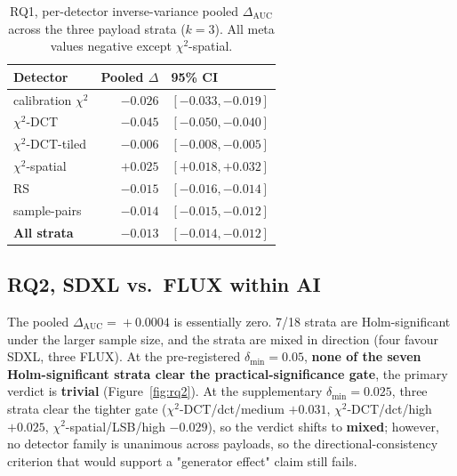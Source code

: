 \documentclass[10pt,twocolumn,a4paper]{article}
\begin{document}
\begin{table}[t]
\centering\small
\caption{RQ1, per-detector inverse-variance pooled $\Delta_\text{AUC}$ across the three payload strata ($k\!=\!3$). All meta values negative except $\chi^2$-spatial.}
\label{tab:rq1meta}
\setlength{\tabcolsep}{5pt}\renewcommand{\arraystretch}{1.1}
\begin{tabular}{@{}l r l@{}}
\toprule
\textbf{Detector} & \textbf{Pooled $\Delta$} & \textbf{95\% CI} \\
\midrule
calibration $\chi^2$    & $-0.026$ & $[-0.033, -0.019]$ \\
$\chi^2$-DCT            & $-0.045$ & $[-0.050, -0.040]$ \\
$\chi^2$-DCT-tiled      & $-0.006$ & $[-0.008, -0.005]$ \\
$\chi^2$-spatial        & $+0.025$ & $[+0.018, +0.032]$ \\
RS                      & $-0.015$ & $[-0.016, -0.014]$ \\
sample-pairs            & $-0.014$ & $[-0.015, -0.012]$ \\
\midrule
\textbf{All strata}     & $\boldsymbol{-0.013}$ & $\boldsymbol{[-0.014, -0.012]}$ \\
\bottomrule
\end{tabular}
\end{table}

\subsection{RQ2, SDXL vs.\ FLUX within AI}

The pooled $\Delta_\text{AUC}\!=\!+0.0004$ is essentially zero. 7/18 strata are Holm-significant under the larger sample size, and the strata are mixed in direction (four favour SDXL, three FLUX). At the pre-registered $\delta_\text{min}\!=\!0.05$, \textbf{none of the seven Holm-significant strata clear the practical-significance gate}, the primary verdict is \textbf{trivial} (Figure~\ref{fig:rq2}). At the supplementary $\delta_\text{min}\!=\!0.025$, three strata clear the tighter gate ($\chi^2$-DCT/dct/medium $+0.031$, $\chi^2$-DCT/dct/high $+0.025$, $\chi^2$-spatial/LSB/high $-0.029$), so the verdict shifts to \textbf{mixed}; however, no detector family is unanimous across payloads, so the directional-consistency criterion that would support a "generator effect" claim still fails.
\end{document}
